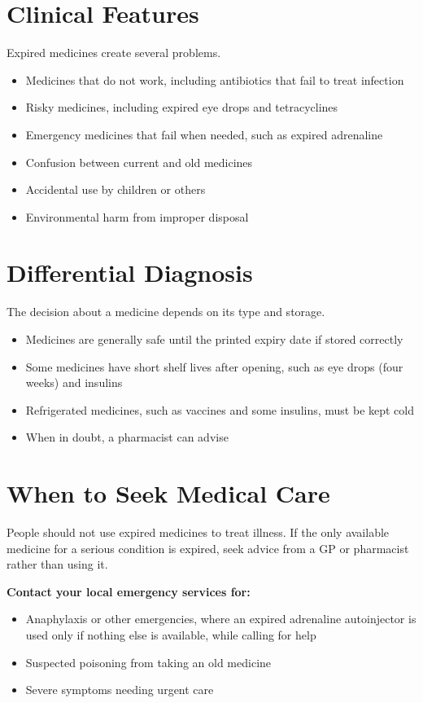 \section*{Clinical Features}
Expired medicines create several problems.
\begin{itemize}
    \item Medicines that do not work, including antibiotics that fail to treat infection
    \item Risky medicines, including expired eye drops and tetracyclines
    \item Emergency medicines that fail when needed, such as expired adrenaline
    \item Confusion between current and old medicines
    \item Accidental use by children or others
    \item Environmental harm from improper disposal
\end{itemize}

\section*{Differential Diagnosis}
The decision about a medicine depends on its type and storage.
\begin{itemize}
    \item Medicines are generally safe until the printed expiry date if stored correctly
    \item Some medicines have short shelf lives after opening, such as eye drops (four weeks) and insulins
    \item Refrigerated medicines, such as vaccines and some insulins, must be kept cold
    \item When in doubt, a pharmacist can advise
\end{itemize}

\section*{When to Seek Medical Care}
People should not use expired medicines to treat illness. If the only available medicine for a serious condition is expired, seek advice from a GP or pharmacist rather than using it.

\textbf{Contact your local emergency services for:}
\begin{itemize}
    \item Anaphylaxis or other emergencies, where an expired adrenaline autoinjector is used only if nothing else is available, while calling for help
    \item Suspected poisoning from taking an old medicine
    \item Severe symptoms needing urgent care
\end{itemize}

